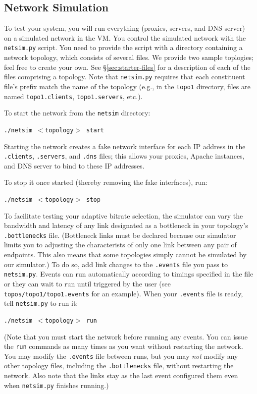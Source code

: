 \documentclass{article}
\begin{document}
\subsection{Network Simulation}
\label{sec:netsim}

To test your system, you will run everything (proxies, servers, and DNS server)
on a simulated network in the VM. You control the simulated network with the
\texttt{netsim.py} script. You need to provide the script with a directory
containing a network topology, which consists of several files. We provide two
sample toplogies; feel free to create your own. See \S\ref{sec:starter-files}
for a description of each of the files comprising a topology. Note that
\texttt{netsim.py} requires that each constituent file's prefix match the name
of the topology (e.g., in the \texttt{topo1} directory, files are named
\texttt{topo1.clients}, \texttt{topo1.servers}, etc.).

To start the network from the \texttt{netsim} directory:
\begin{center}
	\texttt{./netsim $<$topology$>$ start}
\end{center}
Starting the network creates a fake network interface for each IP address in
the \texttt{.clients}, \texttt{.servers}, and \texttt{.dns} files; this allows
your proxies, Apache instances, and DNS server to bind to these IP addresses.

To stop it once started (thereby removing the fake interfaces), run:
\begin{center}
	\texttt{./netsim $<$topology$>$ stop}
\end{center}

To facilitate testing your adaptive bitrate selection, the simulator can vary
the bandwidth and latency of any link designated as a bottleneck in your
topology's \texttt{.bottlenecks} file. (Bottleneck links must be declared
because our simulator limits you to adjusting the characterists of only one
link between any pair of endpoints. This also means that some topologies simply
cannot be simulated by our simulator.) To do so, add link changes to the
\texttt{.events} file you pass to \texttt{netsim.py}. Events can run
automatically according to timings specified in the file or they can wait to
run until triggered by the user (see \texttt{topos/topo1/topo1.events} for an
example). When your \texttt{.events} file is ready, tell \texttt{netsim.py} to
run it:
\begin{center}
	\texttt{./netsim $<$topology$>$ run}
\end{center}
(Note that you must start the network before running any events. You can issue
the \texttt{run} commands as many times as you want without restarting the
network. You may modify the \texttt{.events} file between runs, but you may
\emph{not} modify any other topology files, including the \texttt{.bottlenecks}
file, without restarting the network. Also note that the links stay as the last
event configured them even when \texttt{netsim.py} finishes running.)
\end{document}
